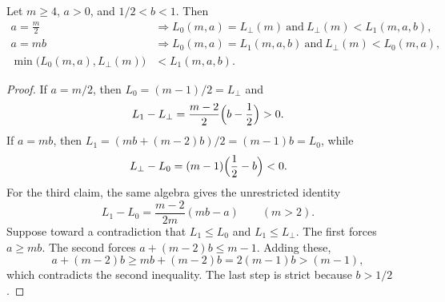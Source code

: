 \begin{lemma}\label{sc:lemma8.2}
Let \(m\ge 4\), \(a>0\), and \(1/2<b<1\). Then
\begin{align*}
a=\frac m2&\Longrightarrow L_0(m,a)=L_\perp(m)\ \text{and}\ L_\perp(m)<L_1(m,a,b),\\[4pt]
a=mb&\Longrightarrow L_0(m,a)=L_1(m,a,b)\ \text{and}\ L_\perp(m)<L_0(m,a),\\[4pt]
\min\bigl(L_0(m,a),L_\perp(m)\bigr)&<L_1(m,a,b).
\end{align*}

\end{lemma}
\begin{proof}
If \(a=m/2\), then \(L_0=(m-1)/2=L_\perp\) and
\[
L_1-L_\perp=\frac{m-2}{2}\Bigl(b-\frac12\Bigr)>0.
\]
If \(a=mb\), then \(L_1=(mb+(m-2)b)/2=(m-1)b=L_0\), while
\[
L_\perp-L_0=(m-1)\Bigl(\frac12-b\Bigr)<0.
\]
For the third claim, the same algebra gives the unrestricted identity
\[
L_1-L_0=\frac{m-2}{2m}(mb-a)\qquad(m>2).
\]
Suppose toward a contradiction that \(L_1\le L_0\) and \(L_1\le L_\perp\). The first forces \(a\ge mb\). The second forces \(a+(m-2)b\le m-1\). Adding these,
\[
a+(m-2)b\ge mb+(m-2)b=2(m-1)b>(m-1),
\]
which contradicts the second inequality. The last step is strict because \(b>1/2\).

\end{proof}

